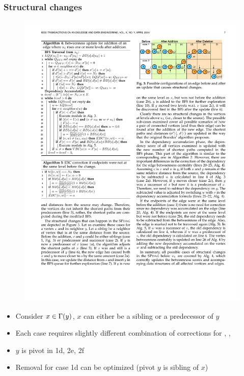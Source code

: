 \begin{frame}
  \frametitle{Structural changes}

  \begin{figure}[t]
    \centering
    \includegraphics[width=\textwidth, height=0.5\textheight, keepaspectratio]{imgs/kdb-cases}
  \end{figure}

  \begin{itemize}
    \item Consider $x \in \Gamma(y)$, $x$ can either be a sibling or a predecessor of $y$
    \item Each case requires slightly different combination of corrections for \dist, \paths, \dep
    \item $y$ is pivot in 1d, 2e, 2f
    \item Removal for case 1d can be optimized (pivot $y$ is sibling of $x$)
  \end{itemize}

\end{frame}


